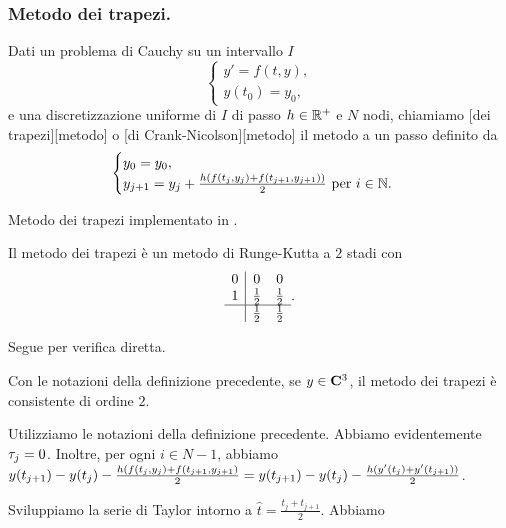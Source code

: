 \subsubsection{Metodo dei trapezi.}
\label{MetodiNumericiPerEquazioniDifferenzialiOrdinarie_MetodoDeiTrapezi}
\begin{Definition}
	Dati un problema di Cauchy su un intervallo $I$
	\[
	\begin{cases}
		y' = f(t,y),\\
		y(t_0) = y_0,
	\end{cases}
	\]
	e una discretizzazione uniforme di $I$ di passo $h \in \mathbb{R}^+$ e $N$ nodi, chiamiamo [dei trapezi][metodo] o [di Crank-Nicolson][metodo] il metodo a un passo definito da
	\[
	\begin{cases}
		y_0 = y_0,\\
		y_{j + 1} = y_j + \frac{h (f(t_j,y_j) + f(t_{j + 1},y_{j + 1}))}{2}\text{ per }i \in \mathbb{N}.
	\end{cases}
	\]
\end{Definition}
\begin{listing}
	\caption{Metodo dei trapezi implementato in .}
\end{listing}
\begin{Theorem}
	Il metodo dei trapezi \`e un metodo di Runge-Kutta a $2$ stadi con \tableau
	\[
	\begin{array}{c|cc}
	0	&	0	&	0\\
	1	&	\frac{1}{2}	&	\frac{1}{2}\\
	\hline
		&	\frac{1}{2}	&	\frac{1}{2}
	\end{array}.
	\]
\end{Theorem}
\Proof Segue per verifica diretta. \EndProof
\begin{Theorem}
	Con le notazioni della definizione precedente, se $y \in \CClass{3}$, il metodo dei trapezi \`e consistente di ordine $2$.
\end{Theorem}
\Proof Utilizziamo le notazioni della definizione precedente. Abbiamo evidentemente $\tau_j = 0$. Inoltre, per ogni $i \in N - 1$, abbiamo $y(t_{j + 1}) - y(t_j) - \frac{h (f(t_j,y_j) + f(t_{j + 1}, y_{j + 1})}{2} = y(t_{j + 1}) - y(t_j) - \frac{h (y'(t_j) + y'(t_{j + 1}))}{2}$.
\par Sviluppiamo la serie di Taylor intorno a $\hat{t} = \frac{t_j + t_{j + 1}}{2}$. Abbiamo
